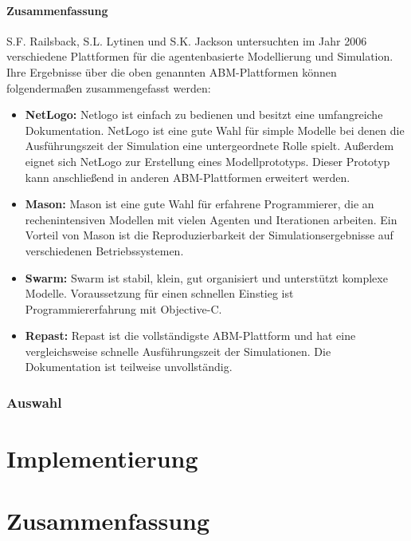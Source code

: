 \documentclass[a4paper, 11pt]{article}
\begin{document}
\paragraph{Zusammenfassung}
S.F. Railsback, S.L. Lytinen und S.K. Jackson untersuchten im Jahr 2006 verschiedene Plattformen für die agentenbasierte Modellierung und Simulation. Ihre Ergebnisse über die oben genannten ABM-Plattformen können folgendermaßen zusammengefasst werden:
\begin{itemize}
	\item \textbf{NetLogo:} Netlogo ist einfach zu bedienen und besitzt eine umfangreiche Dokumentation. NetLogo ist eine gute Wahl für simple Modelle bei denen die Ausführungszeit der Simulation eine untergeordnete Rolle spielt. Außerdem eignet sich NetLogo zur Erstellung eines Modellprototyps. Dieser Prototyp kann anschließend in anderen ABM-Plattformen erweitert werden.
	\item \textbf{Mason:} Mason ist eine gute Wahl für erfahrene Programmierer, die an rechenintensiven Modellen mit vielen Agenten und Iterationen arbeiten. Ein Vorteil von Mason ist die Reproduzierbarkeit der Simulationsergebnisse auf verschiedenen Betriebssystemen.
	\item \textbf{Swarm:} Swarm ist stabil, klein, gut organisiert und unterstützt komplexe Modelle. Voraussetzung für einen schnellen Einstieg ist Programmiererfahrung mit Objective-C.
	\item \textbf{Repast:} Repast ist die vollständigste ABM-Plattform und hat eine vergleichsweise schnelle Ausführungszeit der Simulationen. Die Dokumentation ist teilweise unvollständig.
\end{itemize}

\subsubsection{Auswahl}
 
\section{Implementierung}
\section{Zusammenfassung}
\end{document}
